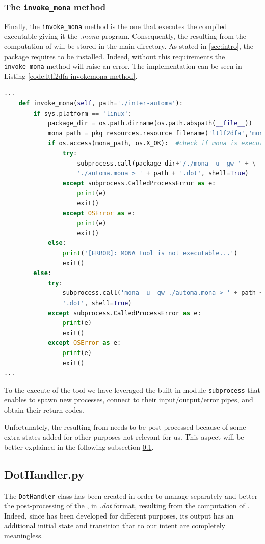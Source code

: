 \subsubsection{The \texttt{invoke\_mona} method}
Finally, the \texttt{invoke\_mona} method is the one that executes the \MONA compiled executable giving it the \textit{.mona} program. Consequently, the \DFA resulting from the computation of \MONA will be stored in the main directory. As stated in \ref{sec:intro}, the \LTLfToDFA package requires \MONA to be installed. Indeed, without this requirements the \texttt{invoke\_mona} method will raise an error. The implementation can be seen in Listing \ref{code:ltlf2dfa-invokemona-method}.
\begin{lstlisting}[language=Python, style=Python, escapechar = £, label={code:ltlf2dfa-invokemona-method}, caption={The \texttt{invoke\_mona} method.}]
...
    def invoke_mona(self, path='./inter-automa'):
        if sys.platform == 'linux':
            package_dir = os.path.dirname(os.path.abspath(__file__))
            mona_path = pkg_resources.resource_filename('ltlf2dfa','mona')
            if os.access(mona_path, os.X_OK):  #check if mona is executable
                try:
                    subprocess.call(package_dir+'/./mona -u -gw ' + \
                    './automa.mona > ' + path + '.dot', shell=True)
                except subprocess.CalledProcessError as e:
                    print(e)
                    exit()
                except OSError as e:
                    print(e)
                    exit()
            else:
                print('[ERROR]: MONA tool is not executable...')
                exit()
        else:
            try:
                subprocess.call('mona -u -gw ./automa.mona > ' + path + \
                '.dot', shell=True)
            except subprocess.CalledProcessError as e:
                print(e)
                exit()
            except OSError as e:
                print(e)
                exit()
...            
\end{lstlisting}
To the execute of the \MONA tool we have leveraged the built-in module \texttt{subprocess} that enables to spawn new processes, connect to their input/output/error pipes, and obtain their return codes.

Unfortunately, the \DFA resulting from \MONA needs to be post-processed because of some extra states added for other purposes not relevant for us. This aspect will be better explained in the following subsection \ref{sec:dot-handler}. 
\subsection{DotHandler.py}\label{sec:dot-handler}
The \texttt{DotHandler} class has been created in order to manage separately and better the post-processing of the \DFA, in \textit{.dot} format, resulting from the computation of \MONA. Indeed, since \MONA has been developed for different purposes, its output has an additional initial state and transition that to our intent are completely meaningless. 

